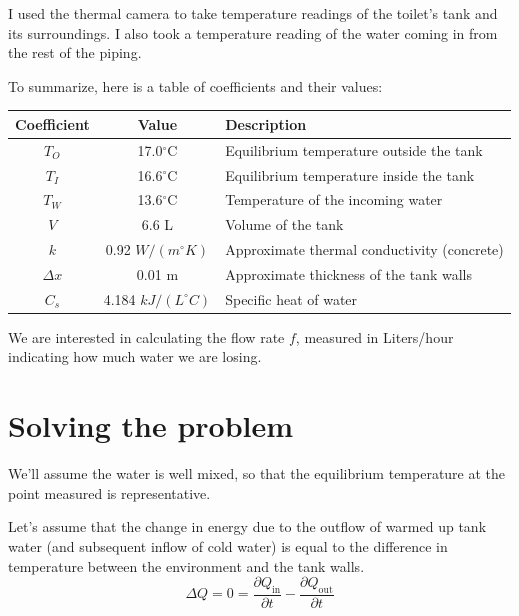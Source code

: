 \documentclass[12pt]{article}
\newcommand{\pderiv}[2]{\frac{\partial #1}{\partial #2}}
\begin{document}
I used the thermal camera to take temperature readings of the toilet's tank and its surroundings. I also took a temperature reading of the water coming in from the rest of the piping.

To summarize, here is a table of coefficients and their values:

\begin{center}
\begin{tabular}{ | c | c | l | }
    \hline
    Coefficient & Value & Description \\
    \hline
    \hline
    $T_O$ & 17.0$^\circ$C & Equilibrium temperature outside the tank \\
    \hline
    $T_I$ & 16.6$^\circ$C & Equilibrium temperature inside the tank \\
    \hline
    $T_W$ & 13.6$^\circ$C & Temperature of the incoming water \\
    \hline
    $V$ & 6.6 L & Volume of the tank \\
    \hline
    $k$ & 0.92 $W/(m^{\circ}K)$ & Approximate thermal conductivity (concrete) \\
    \hline
    $\Delta x$ & 0.01 m & Approximate thickness of the tank walls \\
    \hline
    $C_s$ & 4.184 $kJ/(L^{\circ}C)$ & Specific heat of water \\
    \hline
\end{tabular}
\end{center}

We are interested in calculating the flow rate $f$, measured in Liters/hour indicating how much water we are losing.

\clearpage
\section*{Solving the problem}
We'll assume the water is well mixed, so that the equilibrium temperature at the point measured is representative. 


Let's assume that the change in energy due to the outflow of warmed up tank water (and subsequent inflow of cold water) is equal to the difference in temperature between the environment and the tank walls. 
\[ \Delta Q = 0 = \pderiv{Q_\text{in}}{t} - \pderiv{Q_\text{out}}{t} \]
\end{document}
